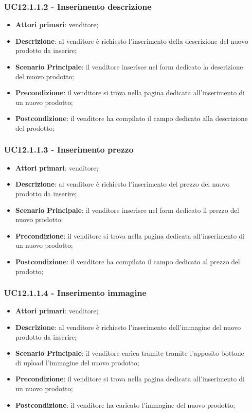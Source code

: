 \subsubsection{UC12.1.1.2 - Inserimento descrizione}
\begin{itemize}
\item \textbf{Attori primari}: venditore;
\item \textbf{Descrizione}: al venditore è richiesto l'inserimento della descrizione del nuovo prodotto da inserire;
\item \textbf{Scenario Principale}: il venditore inserisce nel form dedicato la descrizione del nuovo prodotto;
\item \textbf{Precondizione}: il venditore si trova nella pagina dedicata all'inserimento di un nuovo prodotto;
\item \textbf{Postcondizione}: il venditore ha compilato il campo dedicato alla descrizione del prodotto;
\end{itemize}

\subsubsection{UC12.1.1.3 - Inserimento prezzo}
\begin{itemize}
\item \textbf{Attori primari}: venditore;
\item \textbf{Descrizione}: al venditore è richiesto l'inserimento del prezzo del nuovo prodotto da inserire;
\item \textbf{Scenario Principale}: il venditore inserisce nel form dedicato il prezzo del nuovo prodotto;
\item \textbf{Precondizione}: il venditore si trova nella pagina dedicata all'inserimento di un nuovo prodotto;
\item \textbf{Postcondizione}: il venditore ha compilato il campo dedicato al prezzo del prodotto;
\end{itemize}

\subsubsection{UC12.1.1.4 - Inserimento immagine}
\begin{itemize}
\item \textbf{Attori primari}: venditore;
\item \textbf{Descrizione}: al venditore è richiesto l'inserimento dell'immagine del nuovo prodotto da inserire;
\item \textbf{Scenario Principale}: il venditore carica tramite tramite l'apposito bottone di upload l'immagine del nuovo prodotto;
\item \textbf{Precondizione}: il venditore si trova nella pagina dedicata all'inserimento di un nuovo prodotto;
\item \textbf{Postcondizione}: il venditore ha caricato l'immagine del nuovo prodotto;
\end{itemize}

